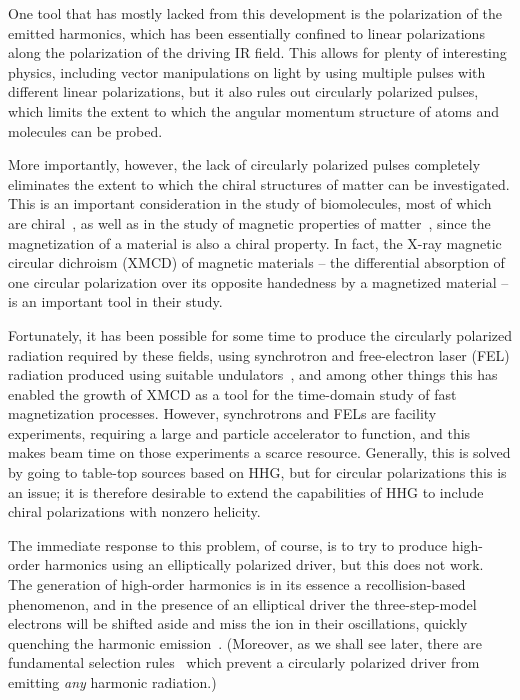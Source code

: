 One tool that has mostly lacked from this development is the polarization of the emitted harmonics, which has been essentially confined to linear polarizations along the polarization of the driving IR field. This allows for plenty of interesting physics, including vector manipulations on light by using multiple pulses with different linear polarizations, but it also rules out circularly polarized pulses, which limits the extent to which the angular momentum structure of atoms and molecules can be probed.

More importantly, however, the lack of circularly polarized pulses completely eliminates the extent to which the chiral structures of matter can be investigated. This is an important consideration in the study of biomolecules, most of which are chiral~\cite{hergenhahn_pecd-camphor-x-ray_2004, bowering_x-ray-molecular-dichroism_2001}, as well as in the study of magnetic properties of matter~\cite{ boeglin_synchrotron-circular_2010, stamm_femtosecond-xmcd_2007}, since the magnetization of a material is also a chiral property. In fact, the X-ray magnetic circular dichroism (XMCD) of magnetic materials -- the differential absorption of one circular polarization over its opposite handedness by a magnetized material -- is an important tool in their study.


Fortunately, it has been possible for some time to produce the circularly polarized radiation required by these fields, using synchrotron and free-electron laser (FEL) radiation produced using suitable undulators~\cite{bahrdt_fel-circular-initial_1992, allaria_FEL-circular_2014, lutman_FEL-polarization_2016}, and among other things this has enabled the growth of XMCD as a tool for the time-domain study of fast magnetization processes. However, synchrotrons and FELs are facility experiments, requiring a large and particle accelerator to function, and this makes beam time on those experiments a scarce resource. Generally, this is solved by going to table-top sources based on HHG, but for circular polarizations this is an issue; it is therefore desirable to extend the capabilities of HHG to include chiral polarizations with nonzero helicity.



The immediate response to this problem, of course, is to try to produce high-order harmonics using an elliptically polarized driver, but this does not work. The generation of high-order harmonics is in its essence a recollision-based phenomenon, and in the presence of an elliptical driver the three-step-model electrons will be shifted aside and miss the ion in their oscillations, quickly quenching the harmonic emission~\cite{antoine_harmonics-polarization_1997, moller_hhg-elliptical-fields_2012, li_quantum-orbit-ellipticity-hhg_2013}. (Moreover, as we shall see later, there are fundamental selection rules~\cite{SelectionRulesInHHG, averbukh_stability_2002} which prevent a circularly polarized driver from emitting \textit{any} harmonic radiation.)


